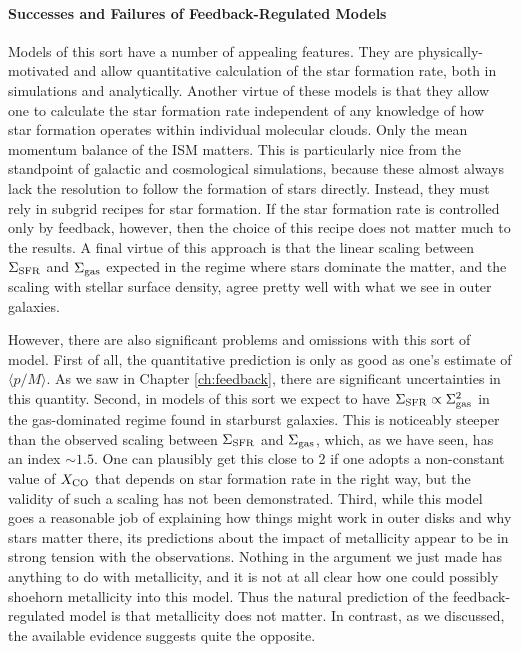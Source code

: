 \paragraph{Successes and Failures of Feedback-Regulated Models}

Models of this sort have a number of appealing features. They are physically-motivated and allow quantitative calculation of the star formation rate, both in simulations and analytically. Another virtue of these models is that they allow one to calculate the star formation rate independent of any knowledge of how star formation operates within individual molecular clouds. Only the mean momentum balance of the ISM matters. This is particularly nice from the standpoint of galactic and cosmological simulations, because these almost always lack the resolution to follow the formation of stars directly. Instead, they must rely in subgrid recipes for star formation. If the star formation rate is controlled only by feedback, however, then the choice of this recipe does not matter much to the results. A final virtue of this approach is that the linear scaling between $\Sigma_{\rm SFR}$ and $\Sigma_{\rm gas}$ expected in the regime where stars dominate the matter, and the scaling with stellar surface density, agree pretty well with what we see in outer galaxies.

However, there are also significant problems and omissions with this sort of model. First of all, the quantitative prediction is only as good as one's estimate of $\langle p/M\rangle$. As we saw in Chapter \ref{ch:feedback}, there are significant uncertainties in this quantity. Second, in models of this sort we expect to have $\Sigma_{\rm SFR} \propto \Sigma_{\rm gas}^2$ in the gas-dominated regime found in starburst galaxies. This is noticeably steeper than the observed scaling between $\Sigma_{\rm SFR}$ and $\Sigma_{\rm gas}$, which, as we have seen, has an index $\sim 1.5$. One can plausibly get this close to 2 if one adopts a non-constant value of $X_{\rm CO}$ that depends on star formation rate in the right way, but the validity of such a scaling has not been demonstrated. Third, while this model goes a reasonable job of explaining how things might work in outer disks and why stars matter there, its predictions about the impact of metallicity appear to be in strong tension with the observations. Nothing in the argument we just made has anything to do with metallicity, and it is not at all clear how one could possibly shoehorn metallicity into this model. Thus the natural prediction of the feedback-regulated model is that metallicity does not matter. In contrast, as we discussed, the available evidence suggests quite the opposite.


